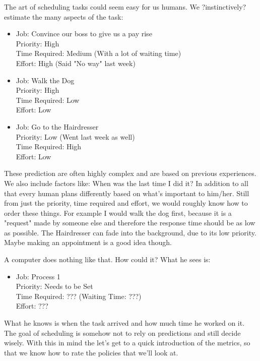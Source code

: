 \documentclass{report}
\begin{document}
The art of scheduling tasks could seem easy for us humans.
We ?instinctively? estimate the many aspects of the task:
\begin{itemize}
\item Job: Convince our boss to give us a pay rise\\Priority: High\\Time Required: Medium (With a lot of waiting time)\\Effort: High (Said "No way" last week)
\item Job: Walk the Dog\\Priority: High\\Time Required: Low\\Effort: Low
\item Job: Go to the Hairdresser\\ Priority: Low (Went last week as well)\\Time Required: High\\Effort: Low
\end{itemize}
These prediction are often highly complex and are based on previous experiences.
We also include factors like: When was the last time I did it?
In addition to all that every human plans differently based on what's important to him/her.
Still from just the priority, time required and effort, we would roughly know how to order these things.
For example I would walk the dog first, because it is a "request" made by someone else and therefore the response time should be as low as possible.
The Hairdresser can fade into the background, due to its low priority. Maybe making an appointment is a good idea though.

A computer does nothing like that. How could it? What he sees is:
\begin{itemize}
\item Job: Process 1\\Priority: Needs to be Set\\Time Required: ??? (Waiting Time: ???)\\Effort: ???
\end{itemize}
What he knows is when the task arrived and how much time he worked on it.
The goal of scheduling is somehow not to rely on predictions and still decide wisely.
With this in mind the let's get to a quick introduction of the metrics, so that we know how to rate the policies that we'll look at.


\pagebreak
\end{document}
